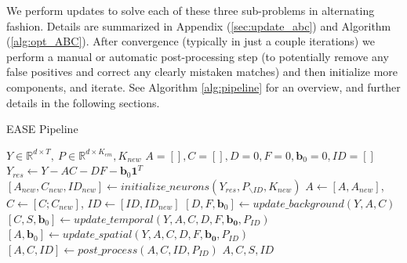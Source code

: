 \documentclass[10pt,letterpaper]{article}
\begin{document}
{%

We perform updates to solve each of these three sub-problems in alternating fashion. Details are summarized in Appendix (\ref{sec:update_abc}) and Algorithm (\ref{alg:opt_ABC}). After convergence (typically in just a couple iterations) we perform a manual or automatic post-processing step (to potentially remove any false positives and correct any clearly mistaken matches) and then initialize more components, and iterate.  See Algorithm \ref{alg:pipeline} for an overview, and further details in the following sections. 

\begin{algorithm}[t!]
\caption{EASE Pipeline}\label{alg:pipeline}
\begin{algorithmic}[1]
\Require $Y\in \mathbb{R}^{d\times T}, ~P\in \mathbb{R}^{d\times K_{em}}, K_{new} $ 
\State $A=[], C=[], D = 0, F =0, \bm{b}_0=0, ID=[]$
	\State {}
	\State $Y_{res} \leftarrow Y-AC-DF-\bm{b}_0\bm{1}^T$
	\State $[A_{new}, C_{new}, ID_{new}] \leftarrow initialize\_neurons(Y_{res}, P_{\backslash ID}, K_{new})$
	\State $A \leftarrow [A, A_{new}]$,  $C \leftarrow [C; C_{new}]$, $ID \leftarrow [ID, ID_{new}]$
	\State {}
		\State $[D, F, \bm{b}_0] \leftarrow update\_background(Y, A, C)$
		\State $ [C, S, \bm{b}_0] \leftarrow update\_temporal(Y, A, C, D, F, \bm{b_0}, P_{ID})$	
		\State $ [A, \bm{b}_0] \leftarrow update\_spatial(Y, A, C, D, F, \bm{b_0}, P_{ID})$
    \EndFor
	\State {}
	\State $[A, C, ID] \leftarrow post\_process(A, C, ID, P_{ID})$
\EndWhile
\State 
\Return $A, C, S, ID$
\end{algorithmic}

\end{algorithm}


}
\end{document}
